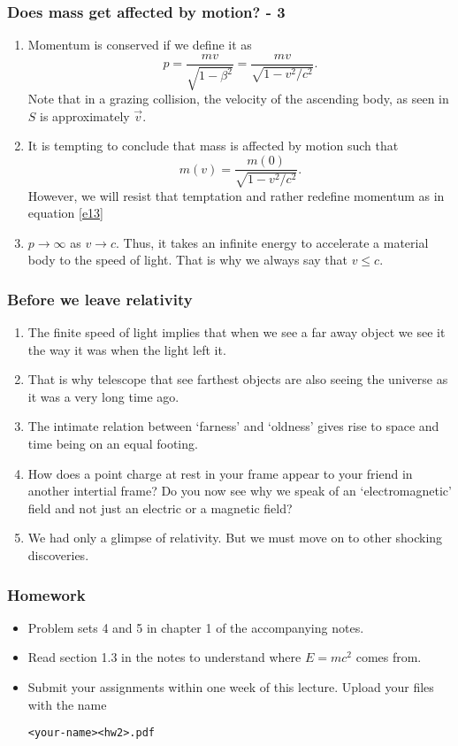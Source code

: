 \documentclass{beamer}
\begin{document}
\begin{frame}
\frametitle{Does mass get affected by motion? - 3}
\begin{enumerate}
\item Momentum is conserved if we define it as
\begin{equation}\label{e13}
p = \frac{mv}{\sqrt{1 - \beta^2}} = \frac{mv}{\sqrt{1 - v^2/c^2}} .
\end{equation}
Note that in a grazing collision, the velocity of the ascending body, as seen
in $S$ is approximately $\vec{v}$.
\item It is tempting to conclude that mass is affected by motion such that
\begin{equation}\label{e14}
m(v) = \frac{m(0)}{\sqrt{1 - v^2/c^2}}.
\end{equation}
However, we will resist that temptation and rather redefine momentum as in
equation \eqref{e13}
\item $p \rightarrow \infty$ as $v \rightarrow c$. Thus, it takes an infinite
energy to accelerate a material body to the speed of light. That is why we
always say that $v \le c$. 
\end{enumerate}
\end{frame}

\begin{frame}
\frametitle{Before we leave relativity}
\begin{enumerate}
\item The finite speed of light implies that when we see a far away object we 
see it the way it was when the light left it. 
\item That is why telescope that see farthest objects are also seeing the 
universe as it was a very long time ago.
\item The intimate relation between `farness' and `oldness' gives rise to 
space and time being on an equal footing.
\item How does a point charge at rest in your frame appear to your friend
in another intertial frame? Do you now see why we speak of an `electromagnetic'
field and not just an electric or a magnetic field?
\item We had only a glimpse of relativity. But we must move on to other 
shocking discoveries.
\end{enumerate}
\end{frame}

\begin{frame}[fragile]
\frametitle{Homework}
\begin{itemize}
\item Problem sets 4 and 5 in chapter 1 of the accompanying notes.
\item Read section 1.3 in the notes to understand where $E = mc^2$ comes from.
\item Submit your assignments within one week of this lecture. Upload your 
files with the name \begin{verbatim}<your-name><hw2>.pdf\end{verbatim}
\end{itemize}
\end{frame}
\end{document}
